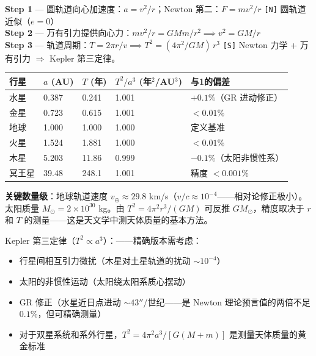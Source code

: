 \begin{derivationbox}[推导]
  \textbf{Step 1} — 圆轨道向心加速度：$a = v^2/r$；Newton 第二：$F = mv^2/r$
  \texttt{[N]} 圆轨道近似（$e=0$）\\
  \textbf{Step 2} — 万有引力提供向心力：$mv^2/r = GMm/r^2 \implies v^2 = GM/r$\\
  \textbf{Step 3} — 轨道周期：$T = 2\pi r/v \implies T^2 = (4\pi^2/GM)\,r^3$
  \quad\texttt{[S]} Newton 力学 + 万有引力 $\Rightarrow$ Kepler 第三定律。
\end{derivationbox}


\begin{oombox}
  \begin{center}
  \footnotesize
  \begin{tabular}{p{2.5cm}p{2cm}p{2cm}p{2.5cm}p{3cm}}
  \toprule
  \textbf{行星} & \textbf{$a$ (AU)} & \textbf{$T$ (年)} & \textbf{$T^2/a^3$ (年$^2$/AU$^3$)} & \textbf{与1的偏差} \\
  \midrule
  水星 & 0.387 & 0.241 & 1.001 & $+0.1\%$（GR 进动修正）\\
  金星 & 0.723 & 0.615 & 1.001 & $<0.01\%$\\
  地球 & 1.000 & 1.000 & 1.000 & 定义基准\\
  火星 & 1.524 & 1.881 & 1.000 & $<0.01\%$\\
  木星 & 5.203 & 11.86  & 0.999 & $-0.1\%$（太阳非惯性系）\\
  冥王星 & 39.48 & 248.1  & 1.001 & 精度 $<0.001\%$\\
  \bottomrule
  \end{tabular}
  \end{center}
  \textbf{关键数量级}：地球轨道速度 $v_\oplus \approx 29.8$ km/s（$v/c \approx 10^{-4}$——相对论修正极小）。太阳质量 $M_\odot = 2\times 10^{30}$ kg。由 $T^2 = 4\pi^2 r^3/(GM)$ 可反推 $GM_\odot$，精度取决于 $r$ 和 $T$ 的测量——这是天文学中测天体质量的基本方法。
\end{oombox}

\precisionbox[精度等级]
  Kepler 第三定律（$T^2 \propto a^3$）：\precisionapprox——精确版本需考虑：\\
  \begin{itemize}
    \item 行星间相互引力微扰（木星对土星轨道的扰动 $\sim 10^{-4}$）
    \item 太阳的非惯性运动（太阳绕太阳系质心摆动）
    \item GR 修正（水星近日点进动 $\sim 43''$/世纪——是 Newton 理论预言值的两倍不足 $0.1\%$，但可精确测量）
    \item 对于双星系统和系外行星，$T^2 = 4\pi^2 a^3/[G(M+m)]$ 是测量天体质量的黄金标准
  \end{itemize}
\endprecisionbox

